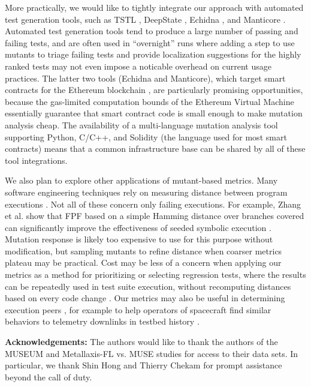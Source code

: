 More practically, we would like to tightly integrate our approach with
automated test generation tools, such as TSTL \cite{tstlsttt,NFM15},
DeepState \cite{DeepState,DeepStateTutorial}, Echidna \cite{Echidna}, and
Manticore \cite{Manticore}.  Automated test generation tools tend to produce a
large number of passing and failing tests, and are often used in
``overnight'' runs where adding a step to use mutants to triage
failing tests and provide localization suggestions for the highly
ranked tests may not even impose a noticable overhead on current usage
practices.  The latter two tools (Echidna and Manticore), which target smart
contracts for the Ethereum blockchain \cite{wood2014ethereum}, are
particularly promising opportunities, because the gas-limited computation bounds of the Ethereum
Virtual Machine essentially guarantee that smart contract code is
small enough to make mutation analysis cheap.  The availability of a
multi-language mutation analysis tool \cite{RegExpMut} supporting
Python, C/C++, and Solidity (the language used for most smart
contracts) means that a common infrastructure base can be shared by
all of these tool integrations.

We also plan to explore other applications of mutant-based metrics.
Many software engineering techniques rely on measuring distance
between program executions \cite{BallConcept,NearNeighbor}.  Not all
of these concern only failing
executions.  For example, Zhang et al. \cite{issta14} show that FPF based on a simple
Hamming distance over branches covered can significantly improve the
effectiveness of seeded symbolic execution
\cite{Zesti,PersonSeed,BugRedux}.  Mutation response is likely too
expensive to use for this purpose without modification, but sampling
mutants to refine distance when coarser metrics plateau
may be practical.  Cost may be less of a concern when applying our
metrics as a method for prioritizing or selecting regression tests,
where the results can be repeatedly used in test suite execution,
without recomputing distances based on every code change
\cite{YooHarman}.  Our metrics may also be useful in determining
execution peers \cite{Sumner2011}, for example to help operators of
spacecraft find similar behaviors to telemetry downlinks in testbed
history \cite{KlausRajeev,scriptstospecs}.

{\scriptsize {\bf Acknowledgements:} The authors would like to thank the authors of
the MUSEUM \cite{multilingual} and Metallaxis-FL vs. MUSE 
\cite{Papadakis} studies for access to their data sets.  In
particular, we thank Shin Hong and Thierry Chekam for prompt
assistance beyond the call of duty.}